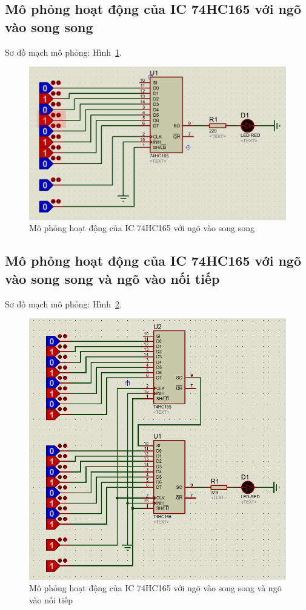 \documentclass[12pt,a4paper]{article}
\newcommand{\fig}[1]{Hình~#1}
\begin{document}
\subsection{Mô phỏng hoạt động của IC 74HC165 với ngõ vào song song}
    Sơ đồ mạch mô phỏng: \fig{\ref{Fig:Simulation_74HC165x1}}.
        \begin{figure}[htp]
            \centering
            \includegraphics[scale=0.6]{Simulation_74HC165x1}
            \caption{Mô phỏng hoạt động của IC 74HC165 với ngõ vào song song}
            \label{Fig:Simulation_74HC165x1}
        \end{figure}

\newpage

\subsection{Mô phỏng hoạt động của IC 74HC165 với ngõ vào song song và ngõ vào nối tiếp}
    Sơ đồ mạch mô phỏng: \fig{\ref{Fig:Simulation_74HC165x2}}.
        \begin{figure}[htp]
            \centering
            \includegraphics[scale=0.8]{Simulation_74HC165x2}
            \caption{Mô phỏng hoạt động của IC 74HC165 với ngõ vào song song và ngõ vào nối tiếp}
            \label{Fig:Simulation_74HC165x2}
        \end{figure}
\end{document}

